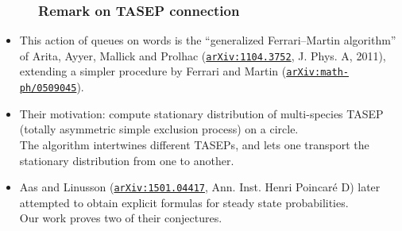 \documentclass{beamer}
\newcommand{\red}{\color{red}}
\newcommand\arxiv[1]{\href{http://www.arxiv.org/abs/#1}{\texttt{arXiv:#1}}}
\newcommand{\fti}[1]{\frametitle{\ \ \ \ \ #1}}
\theoremstyle{plain}
\newcommand{\0}{\phantom{c}}
\begin{document}
\begin{frame}
\fti{Remark on TASEP connection}
\begin{itemize}

\item This action of queues on words is the
      ``generalized Ferrari--Martin algorithm'' of
      Arita, Ayyer, Mallick and Prolhac ({\red \arxiv{1104.3752}},
      J. Phys. A, 2011), extending a simpler procedure by
      Ferrari and Martin
      ({\red \arxiv{math-ph/0509045}}).
      \pause

\item Their motivation: compute stationary distribution of
      multi-species TASEP (totally asymmetric simple exclusion process) on a circle. \\
      The algorithm intertwines different TASEPs, and lets one transport
      the stationary distribution from one to another.

\pause
\item Aas and Linusson ({\red \arxiv{1501.04417}}, Ann. Inst. Henri Poincaré D)
      later attempted to obtain explicit formulas for steady state
      probabilities. \\
      Our work proves two of their conjectures.

\end{itemize}
\end{frame}
\end{document}
